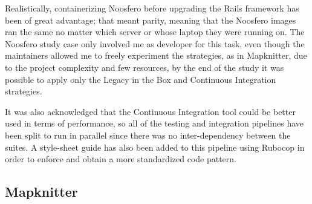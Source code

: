 Realistically, containerizing Noosfero before upgrading the Rails framework has
been of great advantage; that meant parity,  meaning that the Noosfero images
ran the same no matter which server or whose laptop they were running on. The
Noosfero study case only involved me as developer for this task, even though the
maintainers allowed me to freely experiment the strategies, as in Mapknitter,
due to the project complexity and few resources, by the end of the study it was
possible to apply only the Legacy in the Box and Continuous Integration
strategies.

It was also acknowledged that the Continuous Integration tool could be better
used in terms of performance, so all of the testing and integration pipelines
have been split to run in parallel since there was no inter-dependency between
the suites. A style-sheet guide has also been added to this pipeline using
Rubocop in order to enforce and obtain a more standardized code pattern.

\subsection{Mapknitter}

